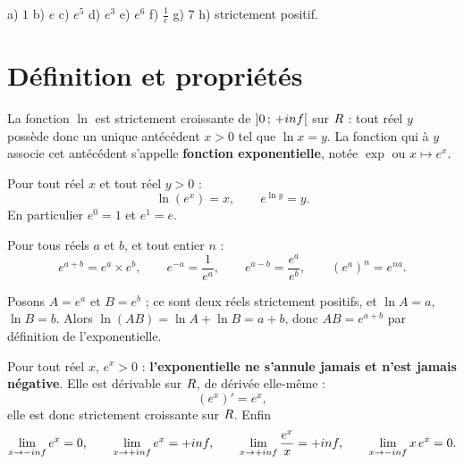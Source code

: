 \begin{corrige}[automatismes]
a) $1$ \quad b) $e$ \quad c) $e^{5}$ \quad d) $e^{3}$ \quad e) $e^{6}$
\quad f) $\frac1e$ \quad g) $7$ \quad h) strictement positif.
\end{corrige}

\section{Définition et propriétés}

\begin{definition}
La fonction $\ln$ est strictement croissante de $\left]0\,;\,+inf\right[$
sur $R$ : tout réel $y$ possède donc un unique antécédent $x>0$ tel que
$\ln x = y$. La fonction qui à $y$ associe cet antécédent s'appelle
\textbf{fonction exponentielle}, notée $\exp$ ou $x \mapsto e^{x}$.
\end{definition}

\begin{propriete}
Pour tout réel $x$ et tout réel $y>0$ :
\[
  \ln\left(e^{x}\right) = x, \qquad e^{\ln y} = y .
\]
En particulier $e^{0} = 1$ et $e^{1} = e$.
\end{propriete}

\begin{theoreme}
Pour tous réels $a$ et $b$, et tout entier $n$ :
\[
  e^{a+b} = e^{a}\times e^{b}, \qquad
  e^{-a} = \frac{1}{e^{a}}, \qquad
  e^{a-b} = \frac{e^{a}}{e^{b}}, \qquad
  \left(e^{a}\right)^{n} = e^{na}.
\]
\end{theoreme}

\begin{demonstration}
Posons $A = e^{a}$ et $B = e^{b}$ ; ce sont deux réels strictement positifs,
et $\ln A = a$, $\ln B = b$. Alors
$\ln(AB) = \ln A+\ln B = a+b$, donc $AB = e^{a+b}$ par définition de
l'exponentielle.
\end{demonstration}

\begin{propriete}
Pour tout réel $x$, $e^{x} > 0$ : \textbf{l'exponentielle ne s'annule
jamais et n'est jamais négative}. Elle est dérivable sur $R$, de dérivée
elle-même :
\[
  \left(e^{x}\right)' = e^{x},
\]
elle est donc strictement croissante sur $R$. Enfin
\[
  \limminf e^{x} = 0, \qquad \limpinf e^{x} = +\infty, \qquad
  \limpinf \frac{e^{x}}{x} = +\infty, \qquad \limminf x\,e^{x} = 0 .
\]
\end{propriete}

